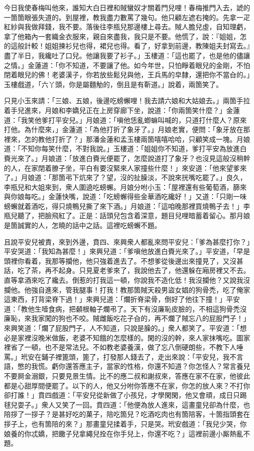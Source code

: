今日我使春梅叫他來，誰知大白日裡和賊蠻奴才關着門兒哩！春梅推門入去，諕的一箇箇眼張失道的。{}到屋裡，教我盡力數罵了幾句。他只顧左遮右掩的。先拿一疋紅紗與我做拜錢，我不要。落後往李瓶兒那邊樓上尋去。賊人膽兒虛，自知理虧，拿了他箱內一套織金衣服來，親自來盡我，我只是不要。他慌了，說：『姐姐，怎的這般計較！姐姐揀衫兒也得，裙兒也得。看了，好拿到前邊，教陳姐夫封寫去。』盡了半日，我纔吐了口兒。他讓我要了衫子。」玉樓道：「這也罷了，也是他的儘讓之情。」金蓮道：「你不知道，不要讓了他。如今年世，只怕睜着眼兒的金剛，不怕閉着眼兒的佛！老婆漢子，你若放些鬆兒與他，王兵馬的皁隸，還把你不當㒲的。」玉樓戲道，「六丫頭，你是屬麵觔的，倒且是有靳道。」說着，兩箇笑了。

只見小玉來請：「三娘、五娘，後邊吃螃蠏哩！我去請六娘和大姑娘去。」兩箇手拉着手兒進來，月娘和李嬌兒正在上房穿廊下坐，說道：「你兩箇笑什麼？」金蓮道：「我笑他爹打平安兒。」月娘道：「嗔他恁亂蝍䗫叫喊的，只道打什麼人？原來打他。為什麼來，」金蓮道：「為他打折了象牙了。」月娘老實，便問：「象牙放在那裡來，怎的教他打折了？」那潘金蓮和孟玉樓兩箇嘻嘻哈哈，只顧笑成一塊。月娘道：「不知你每笑什麼，不對我說。」玉樓道：「姐姐你不知道，爹打平安為放進白賚光來了。」月娘道：「放進白賚光便罷了，怎麼說道打了象牙？也沒見這般沒稍幹的人，在家閉着膫子坐，平白有要沒緊來人家撞些什麼！」來安道：「他來望爹來了。」月娘道：「那箇弔下炕來了？望，沒的扯臊淡，不說來挄嘴吃罷了。」良久，李瓶兒和大姐來到，衆人圍遶吃螃蠏。月娘分咐小玉：「屋裡還有些葡萄酒，篩來與你娘每吃。」金蓮快嘴，說道：「吃螃蠏得些金華酒吃纔好！」又道：「只剛一味螃蠏就着酒吃，得只燒鴨兒撕了來下酒。」月娘道：「這咱晚那裡買燒鴨子去！」李瓶兒聽了，把臉飛紅了。正是：話頭兒包含着深意，題目兒哩暗蓄着留心。那月娘是箇誠實的人，怎曉的話中之話。這裡吃螃蠏不題。

且說平安兒被責，來到外邊，賁四、來興衆人都亂來問平安兒：「爹為甚麼打你？」平安哭道：「我知為甚麼！」來興兒道：「爹嗔他放進白賚光來了。」平安道，「早是頭裡你看着，我那等攔他，他只強着進去了。不想爹從後邊出來撞見了，又沒甚話，吃了茶，再不起身。只見夏老爹來了，我說他去了，他還躲在廂房裡又不去。直等拿酒來吃了纔去。倒惹的打我這一頓，你說我不造化低！我沒攔他？又說我沒攔他。他強自進來，管我腿事！打我！教那箇賊天殺男盜女娼的狗骨禿，吃了俺家這東西，打背梁脊下過！」來興兒道：「爛折脊梁骨，倒好了他往下撞！」平安道：「教他生噎食病，把顙根軸子爛弔了。天下有沒廉恥皮臉的，不相這狗骨禿沒廉恥，來我家闖的狗也不咬。賊雌飯吃花子㒲的，再不爛了賊忘八的屁股門子！」來興笑道：「爛了屁股門子，人不知道，只說是臊的。」衆人都笑了。平安道：「想必是家裡沒晚米做飯，老婆不知餓的怎麼樣的。閑的沒的幹，來人家抹嘴吃。圖家裡省了一頓，也不是常法兒。不如教老婆養漢，做了忘八倒硬朗些，不教下人唾罵。」玳安在鋪子裡篦頭，篦了，打發那人錢去了，走出來說：「平安兒，我不言語，憋的我慌。虧你還答應主子，當家的性格，你還不知道？你怎怪人？常言養兒不要屙金溺銀，只要見景生情。比不的應二叔和謝叔來，答應在家不在家，他彼此都是心甜厚間便罷了。以下的人，他又分咐你答應不在家，你怎的放人來？不打你卻打誰！」賁四戲道：「平安兒從新做了小孩兒，才學閑閑，他又會頑，成日只踢毬兒耍子。」衆人又笑了一回。賁四道：「他便為放人進來，這畫童兒卻為什麼，也陪拶了一拶子？是甚好吃的菓子，陪吃箇兒？吃酒吃肉也有箇陪客，十箇指頭套在拶子上，也有箇陪的來？」那畫童兒揉着手，只是哭。玳安戲道：「我兒少哭，你娘養的你忒嬌，把饊子兒拿繩兒拴在你手兒上，你還不吃？」這裡前邊小厮熱亂不題。

